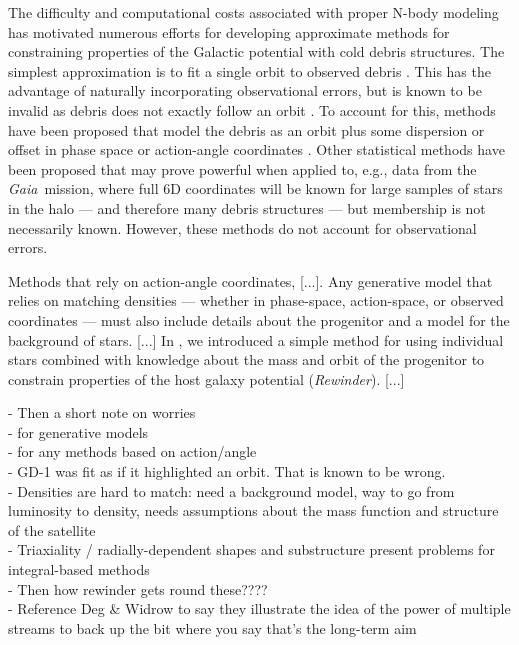\documentclass[letterpaper,12pt,preprint]{aastex}
\newcommand{\project}[1]{\textsl{#1}}
\newcommand{\gaia}{\project{Gaia}~}
\newcommand{\paperone}{Paper 1}
\begin{document}
The difficulty and computational costs associated with proper N-body modeling has motivated numerous efforts for developing approximate methods for constraining properties of the Galactic potential with cold debris structures. The simplest approximation is to fit a single orbit to observed debris \citep[e.g.,][]{koposov10, deg13}. This has the advantage of naturally incorporating observational errors, but is known to be invalid as debris does not exactly follow an orbit \citep[e.g.,][]{binney08, eyre11, sanders13a}. To account for this, methods have been proposed that model the debris as an orbit plus some dispersion or offset in phase space \citep[e.g.,][]{eyre09a, varghese11, kuepper12} or action-angle coordinates \citep{eyre11, sanders13b, bovy14}. Other statistical methods have been proposed \citep[][]{penarrubia12, sanderson14} that may prove powerful when applied to, e.g., data from the \gaia mission, where full 6D coordinates will be known for large samples of stars in the halo --- and therefore many debris structures --- but membership is not necessarily known. However, these methods do not account for observational errors.

Methods that rely on action-angle coordinates, [...]. Any generative model that relies on matching densities --- whether in phase-space, action-space, or observed coordinates --- must also include details about the progenitor and a model for the background of stars. [...] In \citet[][hereafter \paperone]{apw13}, we introduced a simple method for using individual stars combined with knowledge about the mass and orbit of the progenitor to constrain properties of the host galaxy potential (\emph{Rewinder}). [...]

- Then a short note on worries\\
\indent\indent- for generative models\\
\indent\indent- for any methods based on action/angle \\
\indent\indent- GD-1 was fit as if it highlighted an orbit.  That is known to be wrong.\\
\indent\indent- Densities are hard to match: need a background model, way to go from luminosity to density, needs assumptions about the mass function and structure of the satellite\\
\indent\indent- Triaxiality / radially-dependent shapes and substructure present problems for integral-based methods\\
- Then how rewinder gets round these????\\
\indent\indent- Reference Deg \& Widrow to say they illustrate the idea of the power of multiple streams to back up the bit where you say that's the long-term aim\\
\end{document}

